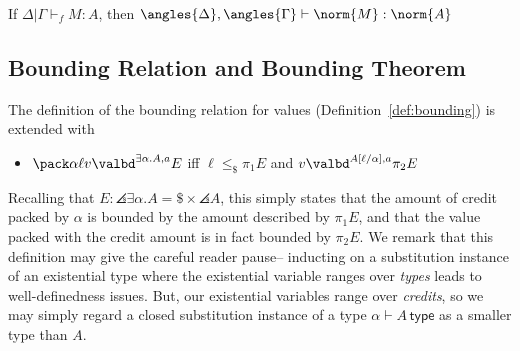 
\begin{theorem}\label{thm:extr-sound-ex}
If $\Delta | \Gamma \vdash_f M : A$, then $\angles{\Delta},\angles{\Gamma} \vdash \norm{M} : \norm{A}$
\end{theorem}


\subsection{Bounding Relation and Bounding Theorem}


The definition of the bounding relation for values (Definition~\ref{def:bounding}) is extended  with
\begin{itemize}
\item
  $\pack \alpha \ell v \valbd^{\exists \alpha.A,a} E$ iff $\ell \leq_{\$} \pi_1 E$ and $v \valbd^{A[\ell/\alpha],a} \pi_2 E$
\end{itemize}
Recalling that $E : \angles{\exists \alpha. A} = \$ \times \angles{A}$, this simply states that the amount of credit packed by $\alpha$ is bounded by the amount described by $\pi_1 E$, and that the value packed with the credit amount is in fact bounded by $\pi_2 E$. We remark that this definition may give the careful reader pause-- inducting on a substitution instance of an existential type where the existential variable ranges over \textit{types} leads to well-definedness issues.
But, our existential variables range over \textit{credits}, so we may simply regard a closed substitution instance of a type $\alpha \vdash A \, \mathsf{type}$ as a smaller type than $A$.


